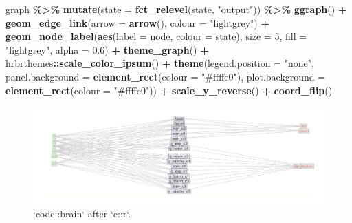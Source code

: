 \documentclass[
]{article}
\newenvironment{Shaded}{\begin{snugshade}}{\end{snugshade}}
\newcommand{\DataTypeTok}[1]{\textcolor[rgb]{0.13,0.29,0.53}{#1}}
\newcommand{\DecValTok}[1]{\textcolor[rgb]{0.00,0.00,0.81}{#1}}
\newcommand{\FloatTok}[1]{\textcolor[rgb]{0.00,0.00,0.81}{#1}}
\newcommand{\KeywordTok}[1]{\textcolor[rgb]{0.13,0.29,0.53}{\textbf{#1}}}
\newcommand{\NormalTok}[1]{#1}
\newcommand{\OperatorTok}[1]{\textcolor[rgb]{0.81,0.36,0.00}{\textbf{#1}}}
\newcommand{\StringTok}[1]{\textcolor[rgb]{0.31,0.60,0.02}{#1}}
\begin{document}
\begin{Shaded}
\begin{Highlighting}[]
\NormalTok{graph }\OperatorTok{\%>\%}\StringTok{ }
\StringTok{  }\KeywordTok{mutate}\NormalTok{(}\DataTypeTok{state =} \KeywordTok{fct\_relevel}\NormalTok{(state, }\StringTok{"output"}\NormalTok{)) }\OperatorTok{\%>\%}\StringTok{ }
\StringTok{  }\KeywordTok{ggraph}\NormalTok{() }\OperatorTok{+}
\StringTok{  }\KeywordTok{geom\_edge\_link}\NormalTok{(}\DataTypeTok{arrow =} \KeywordTok{arrow}\NormalTok{(), }\DataTypeTok{colour =} \StringTok{"lightgrey"}\NormalTok{) }\OperatorTok{+}\StringTok{ }
\StringTok{  }\KeywordTok{geom\_node\_label}\NormalTok{(}\KeywordTok{aes}\NormalTok{(}\DataTypeTok{label =}\NormalTok{ node, }\DataTypeTok{colour =}\NormalTok{ state),  }
                  \DataTypeTok{size =} \DecValTok{5}\NormalTok{,}
                  \DataTypeTok{fill =} \StringTok{"lightgrey"}\NormalTok{,}
                  \DataTypeTok{alpha =} \FloatTok{0.6}\NormalTok{) }\OperatorTok{+}
\StringTok{  }\KeywordTok{theme\_graph}\NormalTok{() }\OperatorTok{+}
\StringTok{  }\NormalTok{hrbrthemes}\OperatorTok{::}\KeywordTok{scale\_color\_ipsum}\NormalTok{() }\OperatorTok{+}
\StringTok{  }\KeywordTok{theme}\NormalTok{(}\DataTypeTok{legend.position =} \StringTok{"none"}\NormalTok{,}
        \DataTypeTok{panel.background =} \KeywordTok{element\_rect}\NormalTok{(}\DataTypeTok{colour =} \StringTok{"\#ffffe0"}\NormalTok{),}
        \DataTypeTok{plot.background =} \KeywordTok{element\_rect}\NormalTok{(}\DataTypeTok{colour =} \StringTok{"\#ffffe0"}\NormalTok{)) }\OperatorTok{+}\StringTok{ }
\StringTok{  }\KeywordTok{scale\_y\_reverse}\NormalTok{() }\OperatorTok{+}\StringTok{ }
\StringTok{  }\KeywordTok{coord\_flip}\NormalTok{()}
\end{Highlighting}
\end{Shaded}

\begin{figure}

{\centering \includegraphics{when-is-done-done_files/figure-latex/unnamed-chunk-14-1} 

}

\caption{`code::brain` after `c::r`.}\label{fig:unnamed-chunk-14}
\end{figure}
\end{document}
